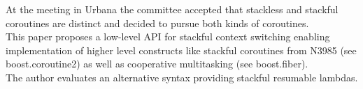 At the meeting in Urbana the committee accepted that stackless and stackful
coroutines are distinct and decided to pursue both kinds of coroutines.\\
This paper proposes a low-level API for stackful context switching enabling
implementation of higher level constructs like stackful coroutines from N3985
(see boost.coroutine2\cite{bcoroutine2}) as well as cooperative multitasking
(see boost.fiber\cite{bfiber}).\\
The author evaluates an alternative syntax providing stackful resumable lambdas.
